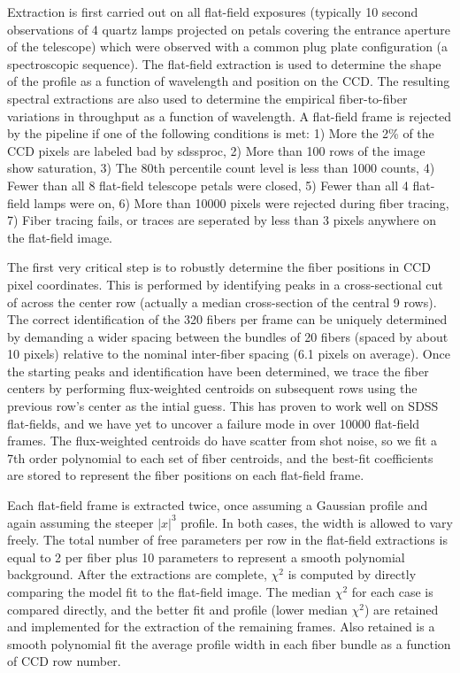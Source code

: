 Extraction is first carried out on all flat-field exposures 
(typically 10 second observations of 4 quartz lamps projected on petals covering the entrance aperture of the telescope) which were observed
with a common plug plate configuration (a spectroscopic sequence). 
The flat-field extraction is used to determine the shape of
the profile as a function of wavelength and position on the CCD.  
The resulting spectral extractions are also used to 
determine the empirical fiber-to-fiber variations in throughput 
as a function of wavelength.   
A flat-field frame is rejected by the pipeline if one of the
following conditions is met:  1) More the 2\% of the CCD pixels are labeled
bad by sdssproc, 2) More than 100 rows of the image show saturation, 
3) The 80th percentile count level is less than 1000 counts, 
4) Fewer than all 8 flat-field telescope petals were closed, 
5) Fewer than all 4 flat-field lamps were on,
6) More than 10000 pixels were rejected during fiber tracing, 
7) Fiber tracing fails, or traces are seperated by less than 3 pixels anywhere
on the flat-field image.

The first very critical step is to robustly determine the fiber positions 
in CCD pixel coordinates.
This is performed by identifying peaks in a cross-sectional cut of across 
the center row (actually a median cross-section of the central 9 rows).  
The correct identification of the 320 fibers per frame can be 
uniquely determined by demanding a wider spacing between the bundles 
of 20 fibers (spaced by about 10 pixels) relative to the nominal inter-fiber 
spacing (6.1 pixels on average).  Once the starting peaks and 
identification have been determined, we trace the fiber centers 
by performing flux-weighted centroids on subsequent rows
using the previous row's center as the intial guess.  This has proven to 
work well on SDSS flat-fields, and we have yet to uncover a failure 
mode in over 10000 flat-field frames.
The flux-weighted centroids do have scatter from shot noise, 
so we fit a 7th order polynomial to each set of fiber centroids, 
and the best-fit coefficients are stored to represent the fiber positions 
on each flat-field frame.


Each flat-field frame is extracted twice, once assuming a Gaussian
profile and again assuming the steeper $|x|^3$ profile.  In both cases,
the width is allowed to vary freely.  The total number of free parameters
per row in the flat-field extractions is equal to 2 per fiber plus 10
parameters to represent a smooth polynomial background.  After the extractions
are complete, $\chi^2$ is computed by directly comparing the model fit
to the flat-field image.  The median $\chi^2$ for each case is compared
directly, and the better fit and profile (lower median $\chi^2$) are retained
and implemented for the extraction of the remaining frames.  Also retained
is a smooth polynomial fit the average profile width in each fiber bundle
as a function of CCD row number.

